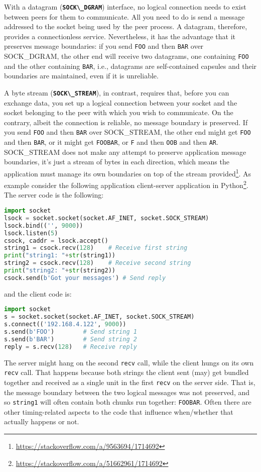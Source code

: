 \documentclass[12pt, letterpaper]{article}
\theoremstyle{definition}
\let\tb\textbf
\let\cd\lstinline
\begin{document}
With a datagram (\tb{\cd+SOCK\_DGRAM+}) interface, no logical connection needs to exist between peers for them to communicate. All you need to do is send a message addressed to the socket being used by the peer process. A datagram, therefore, provides a connectionless service. Nevertheless, it has the advantage that it preserves message boundaries:  if you send \cd+FOO+ and then \cd+BAR+ over SOCK\_DGRAM,  the other end will receive two datagrams, one containing \cd+FOO+ and the other containing \cd+BAR+, i.e., datagrams are self-contained capsules and their boundaries are maintained, even if it is unreliable.

A byte stream (\tb{\cd+SOCK\_STREAM+}), in contrast, requires that, before you can exchange data, you set up a logical connection between your socket and the socket belonging to the peer with which you wish to communicate. On the contrary, albeit the connection is reliable, no message boundary is preserved. If you send \cd+FOO+ and then \cd+BAR+ over SOCK\_STREAM, the other end might get \cd+FOO+ and then \cd+BAR+, or it might get \cd+FOOBAR+, or  \cd+F+ and then \cd+OOB+ and then \cd+AR+. SOCK\_STREAM does not make any attempt to preserve application message boundaries, it's just a stream of bytes in each direction, which means the application must manage its own 
boundaries on top of the stream provided\footnote{\url{https://stackoverflow.com/a/9563694/1714692}}. As example consider the following application client-server application in Python\footnote{\url{https://stackoverflow.com/a/51662961/1714692}}. The server code is the following:
\begin{lstlisting}[language=Python]
import socket
lsock = socket.socket(socket.AF_INET, socket.SOCK_STREAM)
lsock.bind(('', 9000))
lsock.listen(5)
csock, caddr = lsock.accept()
string1 = csock.recv(128)    # Receive first string
print("string1: "+str(string1))
string2 = csock.recv(128)    # Receive second string
print("string2: "+str(string2))
csock.send(b'Got your messages') # Send reply
\end{lstlisting}
and the client code is:
\begin{lstlisting}[language=Python]
import socket
s = socket.socket(socket.AF_INET, socket.SOCK_STREAM)
s.connect(('192.168.4.122', 9000))
s.send(b'FOO')        # Send string 1
s.send(b'BAR')        # Send string 2
reply = s.recv(128)   # Receive reply
\end{lstlisting}
The server might hang on the second \cd+recv+ call, while the client hungs on its own \cd+recv+ call. That happens because both strings the client sent (may) get bundled together and received as a single unit in the first \cd+recv+ on the server side. That is, the message boundary between the two logical messages was not preserved, and so \cd+string1+ will often contain both chunks run together: \cd+FOOBAR+. Often there are other timing-related aspects to the code that influence when/whether that actually happens or not.
\end{document}
